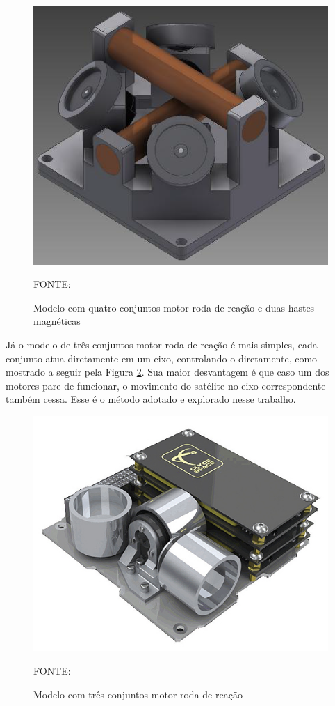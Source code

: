 \documentclass[
	12pt,				%
	openany,			%
	twoside,			%
	a4paper,			%
	english,			%
	french,				%
	spanish,			%
	brazil,				%
	oldfontcommands
	]{abntex2}
\begin{document}
\begin{figure}[th]
	\caption{Modelo com quatro conjuntos motor-roda de reação e duas hastes magnéticas}
	\centering
	\includegraphics[width=0.7\linewidth]{./figs/Ericksson_Reaction_Wheel}
	
	\begin{small}
		FONTE: \cite{Ericksson}
	\end{small}
	\label{fig:ERW}
\end{figure}

\newpage

Já o modelo de três conjuntos motor-roda de reação é mais simples, cada conjunto atua diretamente em um eixo, controlando-o diretamente, como mostrado a seguir pela Figura \ref{fig:3RW}. Sua maior desvantagem é que caso um dos motores pare de funcionar, o movimento do satélite no eixo correspondente também cessa. Esse é o método adotado e explorado nesse trabalho.

\begin{figure}[th]
	\caption{Modelo com três conjuntos motor-roda de reação}
	\centering
	\includegraphics[width=0.6\linewidth]{./figs/3RW}
	
	\begin{small}
		FONTE: \cite{3RW}
	\end{small}
	\label{fig:3RW}
\end{figure}
\end{document}
